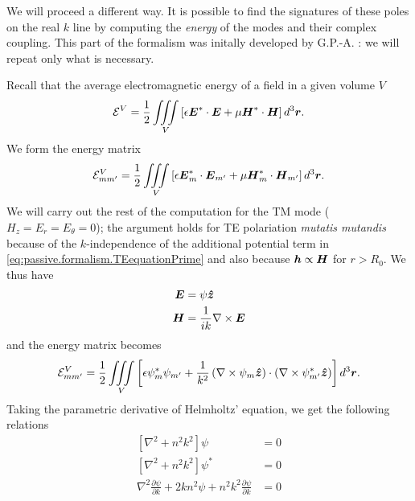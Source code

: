 
We will proceed a different way. It is possible to find the signatures
of these poles on the real $k$ line by computing the \textit{energy}
of the modes and their complex coupling. This part of the formalism
was initally developed by G.P.-A. \cite{GAP2013}: we will repeat
only what is necessary. 

Recall that the average electromagnetic energy of a field
in a given volume $V$
  \begin{equation}
   \mathcal{E}^V = \frac{1}{2}\mathop{\iiint}_V\left[\epsilon\boldsymbol{E}^*\cdot\boldsymbol{E}+\mu\boldsymbol{H}^*\cdot\boldsymbol{H}\right]d^3\boldsymbol{r}.
  \end{equation}
We form the energy matrix 
  \begin{equation}
   \mathcal{E}^V_{mm'} = \frac{1}{2}\mathop{\iiint}_V\left[\epsilon\boldsymbol{E}^*_m\cdot\boldsymbol{E}_{m'}+\mu\boldsymbol{H}^*_m\cdot\boldsymbol{H}_{m'}\right]d^3\boldsymbol{r}.
  \end{equation}
We will carry out the rest of the computation for the TM mode ($H_z=E_r=E_\theta=0$);
the argument holds for TE polariation \textit{mutatis mutandis} because of the
$k$-independence of the additional potential term in \eqref{eq:passive.formalism.TEequationPrime}
and also because $\boldsymbol{h}\propto\boldsymbol{H}$ for $r>R_0$. We thus have 
  \begin{align*}
    \boldsymbol{E}	&= \psi\boldsymbol{\hat{z}}	\\
    \boldsymbol{H}	&= \frac{1}{ik}\nabla\times\boldsymbol{E}
  \end{align*}
and the energy matrix becomes
\begin{align}
    \mathcal{E}^V_{mm'}	&= \frac{1}{2}\mathop{\iiint}_V\left[\epsilon\psi^*_{m}\psi_{m'}+\frac{1}{k^2}\left(\nabla\times\psi_{m}\boldsymbol{\hat{z}}\right)\cdot\left(\nabla\times\psi^*_{m'}\boldsymbol{\hat{z}}\right)\right]d^3\boldsymbol{r}.	\nonumber\\
  \end{align}
Taking the parametric derivative of Helmholtz' equation, we get the 
following relations
  \begin{subequations}
  \label{eq:passive.formalism.parametricHelmholtz}
  \begin{align}
   \left[\nabla^2+n^2k^2\right]\psi								&=0	\\
   \left[\nabla^2+n^2k^2\right]\psi^*								&=0	\\
   \nabla^2\frac{\partial\psi}{\partial k}+2kn^2\psi+n^2k^2\frac{\partial\psi}{\partial k}	&=0
  \end{align}
  \end{subequations}
